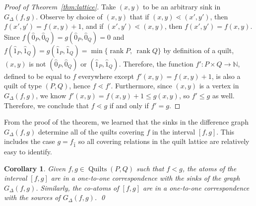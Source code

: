 \documentclass[12pt]{amsart}
\newcommand{\N}{{\mathbb N}}
\numberwithin{equation}{section}
\newtheorem{cor}[theorem]{Corollary}
\theoremstyle{definition}
\newcommand{\longto}{\longrightarrow}
\newcommand{\quilt}{\operatorname{Quilts}}
\newcommand{\rank}{\operatorname{rank}}
\begin{document}
\begin{proof}[Proof of Theorem~\ref{thm:lattice}]
Take $(x,y)$ to be an arbitrary sink in $G_\Delta(f,g)$.  Observe by
choice of $(x,y)$ that if $(x,y) \lessdot (x',y')$, then $f(x',y') =
f(x,y) + 1$, and if $(x',y') \lessdot (x,y)$, then $f(x',y') =
f(x,y)$. Since $f(\hat 0_{P},\hat 0_{Q})=g(\hat 0_{P},\hat 0_{Q})=0$
and $f(\hat 1_{P},\hat 1_{Q})=g(\hat 1_{P},\hat 1_{Q})=\min\{\rank P,\
\rank Q\}$ by definition of a quilt, $(x,y)$ is not $(\hat 0_{P},\hat
0_{Q})$ or $(\hat 1_{P},\hat 1_{Q})$.  Therefore, the function $f'
\colon P \times Q \longto \N$, defined to be equal to $f$ everywhere
except $f'(x,y)=f(x,y)+1$, is also a quilt of type $(P,Q)$, hence
$f\lessdot f'$.  Furthermore, since $(x,y)$ is a vertex in
$G_\Delta(f,g)$, we know $f'(x,y)=f(x,y)+1\leq g(x,y)$, so $f'\leq g$
as well. Therefore, we conclude that $f \lessdot g$ if and only if
$f'=g$.
\end{proof}

From the proof of the theorem, we learned that the sinks in the
difference graph $G_\Delta(f,g)$ determine all of the quilts covering $f$ in the
interval $[f,g]$.  This includes the case $g=f_{\hat 1}$ so all
covering relations in the quilt lattice are relatively easy to
identify.



\begin{cor}
 Given $f, g \in \quilt(P,Q)$ such that $f < g$, the atoms of the
 interval $[f,g]$ are in a one-to-one correspondence with the sinks of
 the graph $G_\Delta(f,g)$.   Similarly, the co-atoms of $[f,g]$ are
 in a one-to-one correspondence with the sources of $G_\Delta(f,g)$.
\qed
\end{cor}
\end{document}
